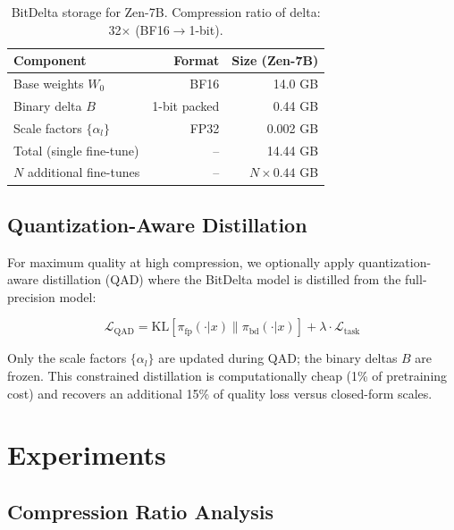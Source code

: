 \documentclass[11pt,a4paper]{article}
\begin{document}
\begin{table}[H]
\centering
\begin{tabular}{lrr}
\toprule
\textbf{Component} & \textbf{Format} & \textbf{Size (Zen-7B)} \\
\midrule
Base weights $W_0$ & BF16 & 14.0 GB \\
Binary delta $B$ & 1-bit packed & 0.44 GB \\
Scale factors $\{\alpha_l\}$ & FP32 & 0.002 GB \\
\midrule
Total (single fine-tune) & -- & 14.44 GB \\
$N$ additional fine-tunes & -- & $N \times 0.44$ GB \\
\bottomrule
\end{tabular}
\caption{BitDelta storage for Zen-7B. Compression ratio of delta: 32$\times$ (BF16$\to$1-bit).}
\end{table}

\subsection{Quantization-Aware Distillation}

For maximum quality at high compression, we optionally apply quantization-aware
distillation (QAD) where the BitDelta model is distilled from the full-precision model:

\begin{equation}
\mathcal{L}_\text{QAD} = \text{KL}\left[\pi_\text{fp}(\cdot|x) \| \pi_\text{bd}(\cdot|x)\right] + \lambda \cdot \mathcal{L}_\text{task}
\end{equation}

Only the scale factors $\{\alpha_l\}$ are updated during QAD; the binary deltas $B$
are frozen. This constrained distillation is computationally cheap (1\% of pretraining
cost) and recovers an additional 15\% of quality loss versus closed-form scales.

\section{Experiments}

\subsection{Compression Ratio Analysis}
\end{document}
